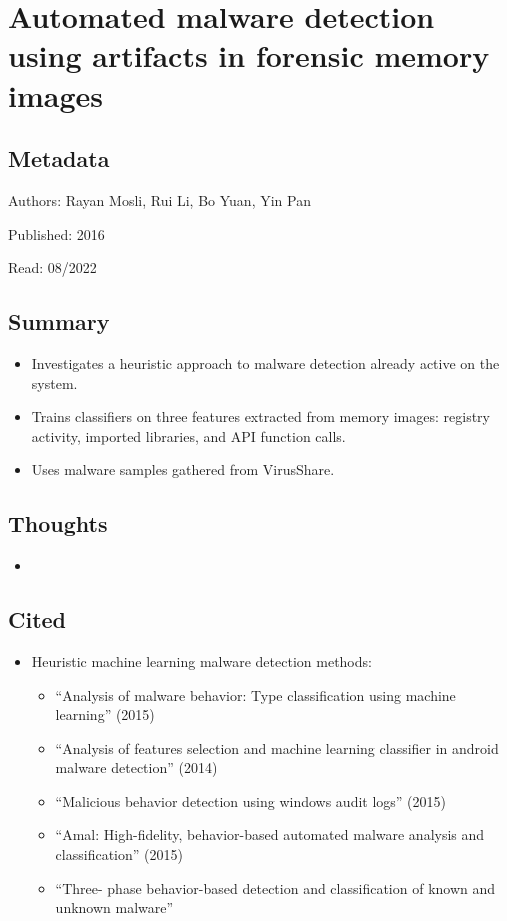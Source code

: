 \documentclass{article}
\begin{document}
\pagebreak


\section*{Automated malware detection using artifacts in forensic memory images}

\subsection*{Metadata}

\noindent Authors: Rayan Mosli, Rui Li, Bo Yuan, Yin Pan

\noindent Published: 2016

\noindent Read: 08/2022

\subsection*{Summary}
\begin{itemize}
\item Investigates a heuristic approach to malware detection already active on the system.
\item Trains classifiers on three features extracted from memory images: registry activity, imported libraries, and API function calls.
\item Uses malware samples gathered from VirusShare.
\end{itemize}

\subsection*{Thoughts}
\begin{itemize}
\item
\end{itemize}

\subsection*{Cited}
\begin{itemize}
\item Heuristic machine learning malware detection methods:
	\begin{itemize}
	\item ``Analysis of malware behavior: Type classification using machine learning'' (2015)
	\item ``Analysis of features selection and machine learning classifier in android malware detection'' (2014)
	\item ``Malicious behavior detection using windows audit logs'' (2015)
	\item ``Amal: High-fidelity, behavior-based automated malware analysis and classification'' (2015)
	\item ``Three- phase behavior-based detection and classification of known and unknown malware''
	\end{itemize}
\end{itemize}
\end{document}
